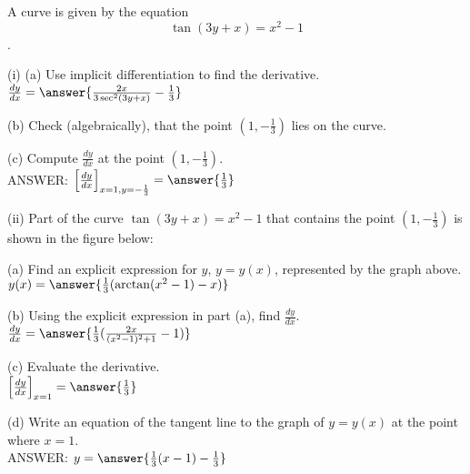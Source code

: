 \documentclass{ximera}
\begin{document}
\begin{exercise}
A curve is given by the equation $$\tan(3y+x)=x^2-1$$.

(i) (a) Use implicit differentiation to find the derivative.\\

 $\frac{dy}{dx}=\answer{\frac{2x}{3\sec^2(3y+x)}-\frac{1}{3}}$

(b) Check (algebraically), that the point $(1,-\frac{1}{3})$ lies on the curve.

(c) Compute $\frac{dy}{dx}$ at the point $(1,-\frac{1}{3})$.\\

ANSWER: $\left[\frac{dy}{dx}\right]_{x=1, y=-\frac{1}{3}}=\answer{\frac{1}{3}}$
 
(ii) Part of the curve $\tan(3y+x)=x^2-1$ that contains the point $(1,-\frac{1}{3})$ is shown in the figure below:

\begin{image}
\end{image}

(a) Find an explicit expression for $y$, $y=y(x)$, represented by the graph above.\\

 $y(x)=\answer{\frac{1}{3}(\arctan(x^2-1)-x)}$

(b) Using the explicit expression in part (a), find $\frac{dy}{dx}$.\\

$\frac{dy}{dx}=\answer{\frac{1}{3}(\frac{2x}{(x^2-1)^2+1}-1)}$

(c) Evaluate the derivative.\\
 $\left[\frac{dy}{dx}\right]_{x=1}=\answer{\frac{1}{3}}$



(d) Write an equation of the tangent line to the graph  of $y=y(x)$ at the point where $x=1$. \\

ANSWER: $y=\answer{\frac{1}{3}(x-1)-\frac{1}{3}}$
\end{exercise}
\end{document}
